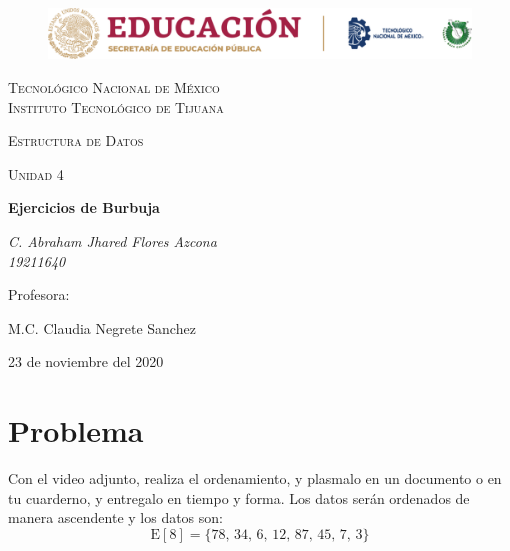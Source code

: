 \documentclass[letterpaper, 12pt]{article}
\begin{document}
    
    \begin{titlepage}
        \begin{figure}[ht]
            \centering
            \includegraphics[width=15cm]{logosITT.png}
        \end{figure}
        \centering
        {\scshape\LARGE Tecnológico Nacional de México\\Instituto Tecnológico de Tijuana\par}
        \vspace{1cm}
        {\scshape\Large Estructura de Datos\par}
        \vspace{1cm}
        {\scshape\Large Unidad 4\par}
        \vspace{1.5cm}
        {\huge\bfseries Ejercicios de Burbuja\par}
        \vspace{2cm}
        {\Large\itshape C. Abraham Jhared Flores Azcona\\19211640\par}
        \vfill
        Profesora: \par
        M.C. Claudia Negrete Sanchez
        
        \vfill

        {\large 23 de noviembre del 2020}
    \end{titlepage}

    \newpage
    \thispagestyle{fancy}
    \setcounter{page}{1}
    \section{Problema}
    Con el video adjunto, realiza el ordenamiento, y plasmalo en un documento o en tu cuarderno, y entregalo en tiempo y forma. Los datos serán ordenados de manera ascendente y los datos son:
    \[\text{E}[8]=\{78,\,34,\,6,\,12,\,87,\,45,\,7,\,3\}\]
\end{document}

